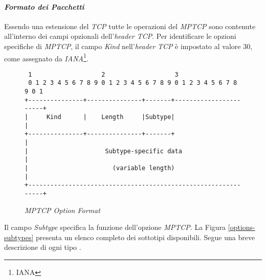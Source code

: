 \paragraph{\textit{Formato dei Pacchetti}}
\noindent Essendo una estensione del \emph{TCP} tutte le operazioni del \emph{MPTCP} sono contenute all'interno dei campi opzionali dell'\emph{header TCP}. 
Per identificare le opzioni specifiche di \emph{MPTCP}, il campo \emph{Kind} nell'\emph{header} \emph{TCP} è impostato al valore 30, come assegnato da \emph{IANA}\footnote{\gls{IANA}}.
\begin{figure}[!h]
    \centering
          \begin{BVerbatim}
 1                   2                   3
 0 1 2 3 4 5 6 7 8 9 0 1 2 3 4 5 6 7 8 9 0 1 2 3 4 5 6 7 8 9 0 1
+---------------+---------------+-------+-----------------------+
|     Kind      |    Length     |Subtype|                       |
+---------------+---------------+-------+                       |
|                     Subtype-specific data                     |
|                       (variable length)                       |
+---------------------------------------------------------------+   
        \end{BVerbatim}
    \caption{\emph{MPTCP Option Format}}
    \label{mptcp-option-format}
\end{figure}

\noindent Il campo \emph{Subtype} specifica la funzione dell'opzione \emph{MPTCP}. La Figura \ref{options-subtypes} presenta un elenco completo dei sottotipi disponibili. Segue una breve descrizione di ogni tipo \cite{site:mptcp-packet}.

